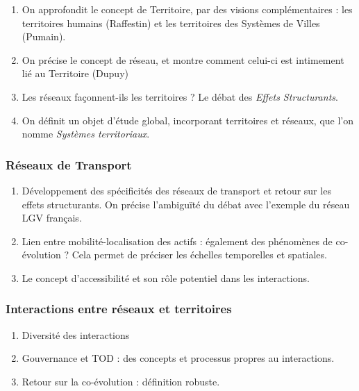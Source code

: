 \begin{enumerate}
	\item On approfondit le concept de Territoire, par des visions complémentaires : les territoires humains (Raffestin) et les territoires des Systèmes de Villes (Pumain).
	\item On précise le concept de réseau, et montre comment celui-ci est intimement lié au Territoire (Dupuy)
	\item Les réseaux façonnent-ils les territoires ? Le débat des \emph{Effets Structurants}.
	\item On définit un objet d'étude global, incorporant territoires et réseaux, que l'on nomme \emph{Systèmes territoriaux}.
\end{enumerate}

\subsubsection{Réseaux de Transport}



\begin{enumerate}
	\item Développement des spécificités des réseaux de transport et retour sur les effets structurants. On précise l'ambiguïté du débat avec l'exemple du réseau LGV français.
	\item Lien entre mobilité-localisation des actifs : également des phénomènes de co-évolution ? Cela permet de préciser les échelles temporelles et spatiales.
	\item Le concept d'accessibilité et son rôle potentiel dans les interactions.
\end{enumerate}



\subsubsection{Interactions entre réseaux et territoires}


\begin{enumerate}
	\item Diversité des interactions
	\item Gouvernance et TOD : des concepts et processus propres au interactions.
	\item Retour sur la co-évolution : définition robuste.
\end{enumerate}



